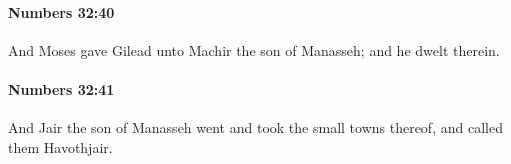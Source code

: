 		\paragraph{Numbers 32:40} %
			\label{NUMBERS-32-40}

			And Moses gave Gilead unto Machir the son of Manasseh; and he dwelt therein.


		\paragraph{Numbers 32:41} %
			\label{NUMBERS-32-41}

			And Jair the son of Manasseh went and took the small towns thereof, and called them Havothjair.



